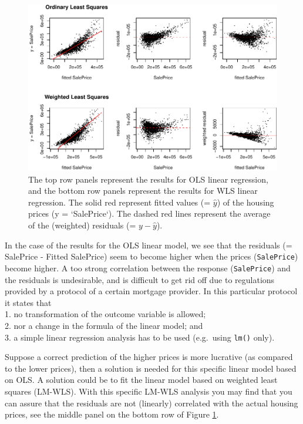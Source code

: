 \documentclass[]{article}
\begin{document}
\begin{figure}[!ht]
\centering
\includegraphics{./0_images/OLSvsWLS.pdf}
\caption{The top row panels represent the results for OLS linear regression, and the bottom row panels represent the results for WLS linear regression. The solid red represent fitted values (= $\widehat{y}$) of the housing prices (y = `SalePrice`). The dashed red lines represent the average of the (weighted) residuals (= $y - \widehat{y}$).}\label{fig:OLS_vs_WLS}
\end{figure}

In the case of the results for the OLS linear model, we see that the
residuals (= SalePrice - Fitted SalePrice) seem to become higher when
the prices (\texttt{SalePrice}) become higher. A too strong correlation
between the response (\texttt{SalePrice}) and the residuals is
undesirable, and is difficult to get rid off due to regulations provided
by a protocol of a certain mortgage provider. In this particular
protocol it states that\\
1. no transformation of the outcome variable is allowed;\\
2. nor a change in the formula of the linear model; and\\
3. a simple linear regression analysis has to be used (e.g.~using
\texttt{lm()} only).

Suppose a correct prediction of the higher prices is more lucrative (as
compared to the lower prices), then a solution is needed for this
specific linear model based on OLS. A solution could be to fit the
linear model based on weighted least squares (LM-WLS). With this
specific LM-WLS analysis you may find that you can assure that the
residuals are not (linearly) correlated with the actual housing prices,
see the middle panel on the bottom row of Figure \ref{fig:OLS_vs_WLS}.
\end{document}
